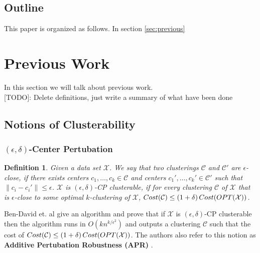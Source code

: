 \documentclass[twoside]{article}
\newcommand{\mc}{\mathcal}
\newtheorem{definition}[theorem]{Definition}
\begin{document}
\subsection{Outline}
This paper is organized as follows. In section \ref{sec:previous}
\section{Previous Work}
In this section we will talk about previous work.\\

[TODO]: Delete definitions, just write a summary of what have been done

\subsection{Notions of Clusterability}

\subsubsection*{$(\epsilon, \delta)$-Center Pertubation \cite{ackerman2009clusterability}}
\begin{definition}
Given a data set $\mc X$. We say that two clusterings $\mc C$ and $\mc C'$ are $\epsilon$-close, if there exists centers $c_1,\ldots, c_k \in \mc C$ and centers $c_1',\ldots, c_k' \in \mc C'$ such that $\|c_i - c_i'\| \le \epsilon$. $\mc X$ is $(\epsilon, \delta)$-CP clusterable, if for every clustering $\mc C$ of $\mc X$ that is $\epsilon$-close to some optimal $k$-clustering of $\mc X$, $Cost(\mc C) \le (1 + \delta) \thinspace Cost(OPT(\mc X))$. 
\end{definition}
Ben-David et. al \cite{ackerman2009clusterability} give an algorithm and prove that if $\mc X$ is $(\epsilon, \delta)$-CP clusterable then the algorithm runs in $O(kn^{k/\epsilon^2})$ and outputs a clustering $\mc C$ such that the cost of $Cost(\mc C) \le (1+\delta)\thinspace Cost(OPT(\mc X))$. The authors also refer to this notion as \textbf{Additive Pertubation Robustness (APR)} \cite{ben2015computational}.  
\end{document}
